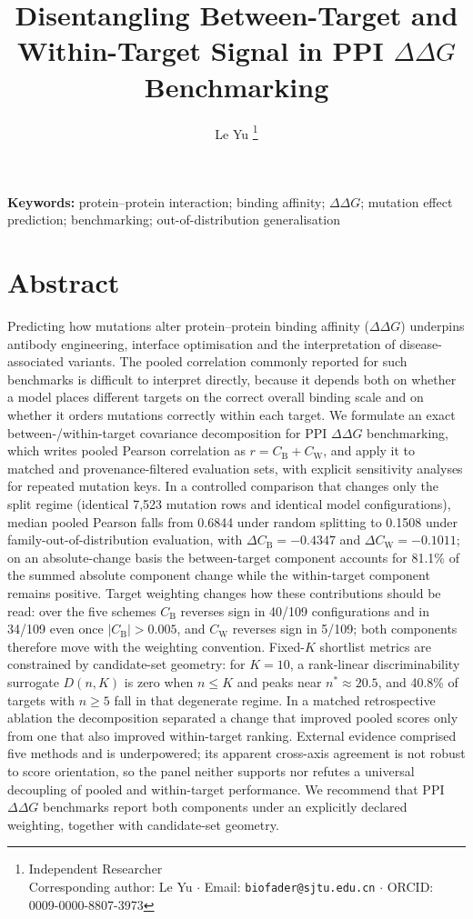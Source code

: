 \documentclass[11pt,a4paper]{article}
\title{\bfseries Disentangling Between-Target and Within-Target Signal in
PPI $\Delta\Delta G$ Benchmarking}
\author{Le Yu
\thanks{Independent Researcher\\
Corresponding author: Le Yu $\cdot$ Email: \texttt{biofader@sjtu.edu.cn}
$\cdot$ ORCID: 0009-0000-8807-3973
}
}
\date{}
\begin{document}
\maketitle

\noindent\textbf{Keywords:} protein--protein interaction; binding affinity;
$\Delta\Delta G$; mutation effect prediction; benchmarking; out-of-distribution
generalisation

\section*{Abstract}
Predicting how mutations alter protein--protein binding affinity ($\Delta\Delta G$)
underpins antibody engineering, interface optimisation and the interpretation of
disease-associated variants. The pooled correlation commonly reported for such benchmarks
is difficult to interpret directly, because it depends both on whether a model places
different targets on the correct overall binding scale and on whether it orders mutations
correctly within each target. We formulate an exact between-/within-target covariance decomposition for
PPI $\Delta\Delta G$ benchmarking, which writes pooled Pearson correlation as
$r = C_{\mathrm{B}} + C_{\mathrm{W}}$, and apply it to
matched and provenance-filtered evaluation sets, with explicit
sensitivity analyses for repeated mutation keys. In a controlled comparison
that changes only the split regime (identical 7{,}523 mutation rows and identical model
configurations), median pooled Pearson falls from 0.6844 under random splitting to 0.1508
under family-out-of-distribution evaluation, with
$\Delta C_{\mathrm{B}} = -0.4347$ and $\Delta C_{\mathrm{W}} = -0.1011$; on an
absolute-change basis the between-target component accounts for 81.1\% of the summed
absolute component change while the within-target component remains positive. Target weighting changes how these contributions should be read: over the five schemes
$C_{\mathrm{B}}$ reverses sign in 40/109 configurations and in 34/109
even once $|C_{\mathrm{B}}| > 0.005$, and $C_{\mathrm{W}}$ reverses sign in 5/109;
both components therefore move with the weighting convention. Fixed-$K$ shortlist metrics are constrained by
candidate-set geometry: for $K = 10$, a rank-linear discriminability surrogate $D(n,K)$
is zero when $n \leq K$ and peaks near $n^{*} \approx 20.5$, and 40.8\% of targets with $n \geq 5$ fall in that degenerate regime.
In a matched retrospective ablation the decomposition separated a change that improved
pooled scores only from one that also improved within-target ranking. External evidence comprised five methods and is underpowered; its apparent cross-axis
agreement is not robust to score orientation, so the panel neither supports nor refutes a
universal decoupling of pooled and within-target performance. We recommend that PPI
$\Delta\Delta G$ benchmarks report both components under an explicitly declared weighting,
together with candidate-set geometry.
\end{document}
